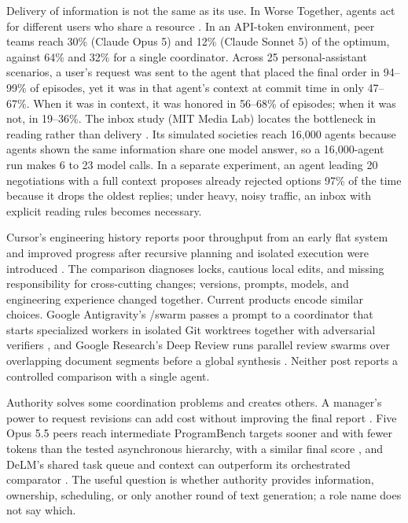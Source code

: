 Delivery of information is not the same as its use. In Worse Together, agents act for different users who share a resource \citep{worse-together,worse-together-blog}. In an API-token environment, peer teams reach 30\% (Claude Opus 5) and 12\% (Claude Sonnet 5) of the optimum, against 64\% and 32\% for a single coordinator. Across 25 personal-assistant scenarios, a user's request was sent to the agent that placed the final order in 94--99\% of episodes, yet it was in that agent's context at commit time in only 47--67\%. When it was in context, it was honored in 56--68\% of episodes; when it was not, in 19--36\%. The inbox study (MIT Media Lab) locates the bottleneck in reading rather than delivery \citep{inbox-coordination-primitive}. Its simulated societies reach 16,000 agents because agents shown the same information share one model answer, so a 16,000-agent run makes 6 to 23 model calls. In a separate experiment, an agent leading 20 negotiations with a full context proposes already rejected options 97\% of the time because it drops the oldest replies; under heavy, noisy traffic, an inbox with explicit reading rules becomes necessary.

Cursor's engineering history reports poor throughput from an early flat system and improved progress after recursive planning and isolated execution were introduced \citep{cursor-scaling-long-running,cursor-self-driving}. The comparison diagnoses locks, cautious local edits, and missing responsibility for cross-cutting changes; versions, prompts, models, and engineering experience changed together. Current products encode similar choices. Google Antigravity's /swarm passes a prompt to a coordinator that starts specialized workers in isolated Git worktrees together with adversarial verifiers \citep{google-antigravity-swarm}, and Google Research's Deep Review runs parallel review swarms over overlapping document segments before a global synthesis \citep{google-deep-review-october}. Neither post reports a controlled comparison with a single agent.

Authority solves some coordination problems and creates others. A manager's power to request revisions can add cost without improving the final report \citep{loop-back-authority}. Five Opus 5.5 peers reach intermediate ProgramBench targets sooner and with fewer tokens than the tested asynchronous hierarchy, with a similar final score \citep{opus55-card}, and DeLM's shared task queue and context can outperform its orchestrated comparator \citep{delm-shared-context}. The useful question is whether authority provides information, ownership, scheduling, or only another round of text generation; a role name does not say which.

